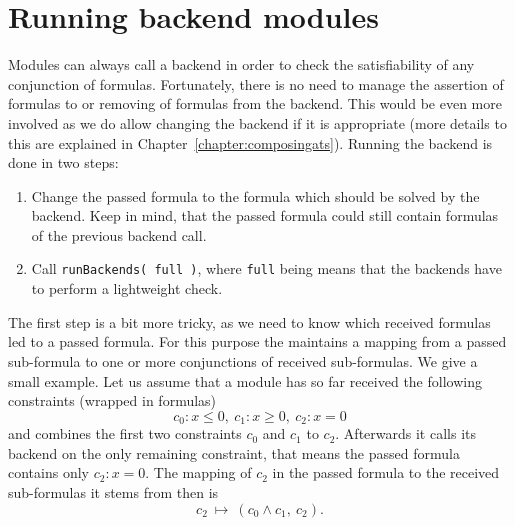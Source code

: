 \section{Running backend modules}
\label{sec:runbackend}
Modules can always call a backend in order to check the satisfiability of any conjunction of formulas.
Fortunately, there is no need to manage the assertion of formulas to or removing of formulas from the backend. 
This would be even more involved as we do allow changing the
backend if it is appropriate (more details to this are explained in Chapter~\ref{chapter:composingats}).
Running the backend is done in two steps:
\begin{enumerate}
	\item Change the passed formula to the formula which should be solved by the backend. Keep in mind,
	       that the passed formula could still contain formulas of the previous backend call. 
	\item Call \texttt{runBackends( full )}, where \texttt{full} being \false means that the backends have to perform a lightweight check.
\end{enumerate}
The first step is a bit more tricky, as we need to know which received formulas led to a passed
formula. For this purpose the \moduleInputClass maintains a mapping from a passed sub-formula to one or more conjunctions of received sub-formulas. We give a small example. Let us assume that a module has so far received the following
constraints (wrapped in formulas)
$$c_0:x\leq0,\ c_1:x\geq 0,\ c_2:x=0$$
and combines the first two constraints $c_0$ and $c_1$ to $c_2$. Afterwards it calls its backend on the only remaining constraint,
that means the passed formula contains only $c_2:x=0$. The mapping of $c_2$ in the passed formula to the received sub-formulas it
stems from then is $$c_2\ \mapsto\ (c_0 \land c_1,\ c_2).$$

